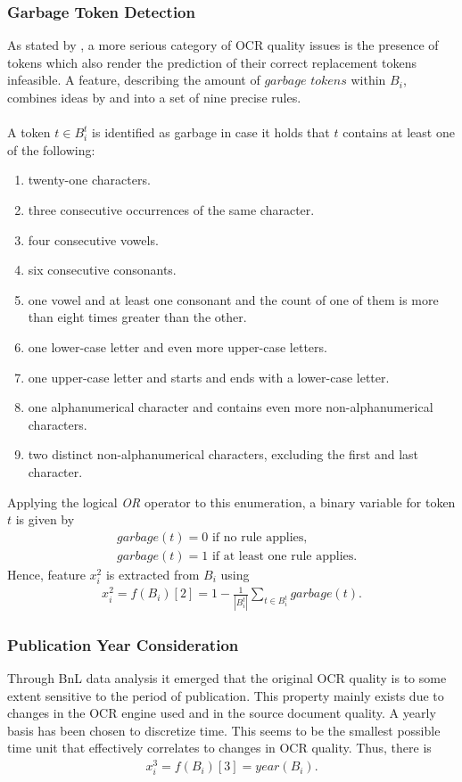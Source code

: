 \documentclass{jdmdh}
\begin{document}
\subsubsection{Garbage Token Detection}
As stated by \citet{wudtke}, a more serious category of OCR quality issues is the presence of tokens which also render the prediction of their correct replacement tokens infeasible. A feature, describing the amount of $garbage$ $tokens$ within $B_i$, combines ideas by \citet{kulp} and \citet{taghva} into a set of nine precise rules. \\ \\
A token $t\!\in\!B_i^t$ is identified as garbage in case it holds that $t$ contains at least one of the following: \\
\begin{enumerate}
    \item twenty-one characters.
    \item three consecutive occurrences of the same character.
    \item four consecutive vowels.
    \item six consecutive consonants.
    \item one vowel and at least one consonant and the count of one of them is more than eight times greater than the other.
    \item one lower-case letter and even more upper-case letters.
    \item one upper-case letter and starts and ends with a lower-case letter.
    \item one alphanumerical character and contains even more non-alphanumerical characters.
    \item two distinct non-alphanumerical characters, excluding the first and last character. \\
\end{enumerate}
Applying the logical \textit{OR} operator to this enumeration, a binary variable for token $t$ is given by
\begin{align}
    &garbage(t) = 0\text{ if no rule applies,} \nonumber \\
    &garbage(t) = 1\text{ if at least one rule applies.}
\end{align}
Hence, feature $x_i^2$ is extracted from $B_i$ using
\begin{align}
    x_i^2 = f(B_i)[2] = 1-\frac{1}{|B_i^t|} \sum_{t\in B_i^t}garbage(t).
\end{align}
\subsubsection{Publication Year Consideration}
Through BnL data analysis it emerged that the original OCR quality is to some extent sensitive to the period of publication. This property mainly exists due to changes in the OCR engine used and in the source document quality. A yearly basis has been chosen to discretize time. This seems to be the smallest possible time unit that effectively correlates to changes in OCR quality.
Thus, there is \\
\begin{align}
    x_i^3 = f(B_i)[3] = year(B_i).
\end{align}
\end{document}
